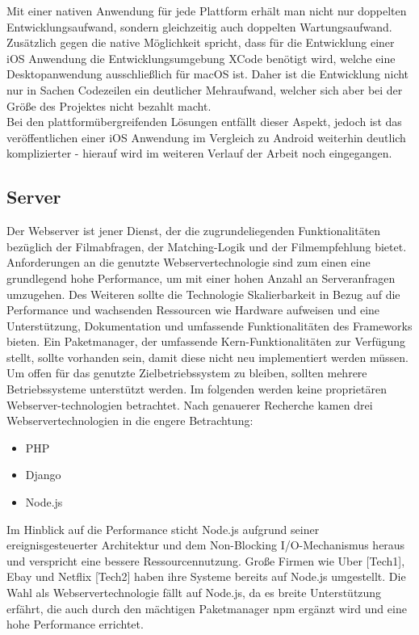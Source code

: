 Mit einer nativen Anwendung für jede Plattform erhält man nicht nur doppelten Entwicklungsaufwand, sondern gleichzeitig auch doppelten Wartungsaufwand. 
Zusätzlich gegen die native Möglichkeit spricht, dass für die Entwicklung einer iOS Anwendung die Entwicklungsumgebung XCode benötigt wird, welche eine Desktopanwendung ausschließlich für macOS ist.
Daher ist die Entwicklung nicht nur in Sachen Codezeilen ein deutlicher Mehraufwand, welcher sich aber bei der Größe des Projektes nicht bezahlt macht.\\
Bei den plattformübergreifenden Lösungen entfällt dieser Aspekt, jedoch ist das veröffentlichen einer iOS Anwendung im Vergleich zu Android weiterhin deutlich komplizierter - hierauf wird im weiteren Verlauf der Arbeit noch eingegangen.




\subsection{Server}
Der Webserver ist jener Dienst,  der die zugrundeliegenden Funktionalitäten bezüglich der Filmabfragen, der Matching-Logik und der Filmempfehlung bietet. 
Anforderungen an die genutzte Webservertechnologie sind zum einen eine grundlegend hohe Performance, um mit einer hohen Anzahl an Serveranfragen umzugehen. Des Weiteren sollte die Technologie Skalierbarkeit in Bezug auf die Performance und wachsenden Ressourcen wie Hardware aufweisen und eine Unterstützung, Dokumentation und umfassende Funktionalitäten des Frameworks bieten. 
Ein Paketmanager, der umfassende Kern-Funktionalitäten zur Verfügung stellt, sollte vorhanden sein, damit diese nicht neu implementiert werden müssen. Um offen für das genutzte Zielbetriebssystem zu bleiben, sollten mehrere Betriebssysteme unterstützt werden. 
Im folgenden werden keine proprietären Webserver-technologien betrachtet.
\newline
Nach genauerer Recherche kamen drei Webservertechnologien in die engere Betrachtung:

\begin{itemize}
	\item PHP
	\item Django
	\item Node.js
\end{itemize} 

Im Hinblick auf die Performance sticht Node.js aufgrund seiner ereignisgesteuerter Architektur  und dem Non-Blocking I/O-Mechanismus heraus und verspricht eine bessere Ressourcennutzung. 
\newline
Große Firmen wie Uber [Tech1], Ebay und Netflix [Tech2] haben ihre Systeme bereits auf Node.js umgestellt. Die Wahl als Webservertechnologie fällt auf Node.js, da es breite Unterstützung erfährt, die auch durch den mächtigen Paketmanager npm ergänzt wird und eine hohe Performance errichtet.


